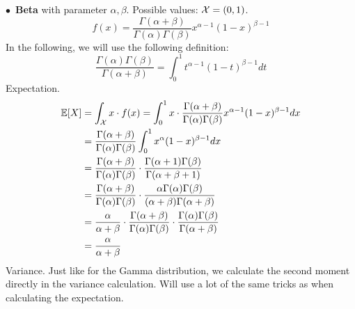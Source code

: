 \bigskip\noindent$\bullet$ \textbf{Beta} with parameter $\alpha,\beta$. Possible values: $\mathcal{X} = (0,1)$. 
$$
f(x) = \frac{\Gamma(\alpha + \beta)}{\Gamma(\alpha)\Gamma(\beta)}x^{\alpha - 1}(1 - x)^{\beta-1}
$$
In the following, we will use the following definition:
$$
\frac{\Gamma(\alpha)\Gamma(\beta)}{\Gamma(\alpha + \beta)} =
\int_0^1 t^{\alpha - 1}(1 - t)^{\beta - 1}dt
$$
Expectation.
\begin{align*}
    \mathbb{E}[X] &= \int_{\mathcal{X}} x\cdot f(x) = \int_0^1 x\cdot\frac{\Gamma(\alpha + \beta)}{\Gamma(\alpha)\Gamma(\beta)}x^{\alpha - 1}(1 - x)^{\beta-1} dx\\
    &= \frac{\Gamma(\alpha + \beta)}{\Gamma(\alpha)\Gamma(\beta)}\int_0^1 x^{\alpha}(1 - x)^{\beta-1} dx\\
    &= \frac{\Gamma(\alpha + \beta)}{\Gamma(\alpha)\Gamma(\beta)}\cdot\frac{\Gamma(\alpha + 1)\Gamma(\beta)}{\Gamma(\alpha + \beta + 1)} \\
    &= \frac{\Gamma(\alpha + \beta)}{\Gamma(\alpha)\Gamma(\beta)}\cdot\frac{\alpha\Gamma(\alpha)\Gamma(\beta)}{(\alpha + \beta)\Gamma(\alpha + \beta)}\\
    &= \frac{\alpha}{\alpha + \beta}\cdot\frac{\Gamma(\alpha + \beta)}{\Gamma(\alpha)\Gamma(\beta)}\cdot\frac{\Gamma(\alpha)\Gamma(\beta)}{\Gamma(\alpha + \beta)}\\
    &= \frac{\alpha}{\alpha + \beta}
\end{align*}
\newpage\noindent
Variance. Just like for the Gamma distribution, we calculate the second moment directly in the variance
calculation. Will use a lot of the same tricks as when calculating the expectation.

